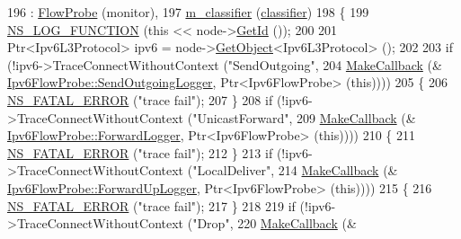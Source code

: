 \begin{DoxyCode}
196   : \hyperlink{classns3_1_1FlowProbe_ae0c5dae57bca03719808497381a24776}{FlowProbe} (monitor),
197     \hyperlink{classns3_1_1Ipv6FlowProbe_a6b4af52e7aef1c6d73e4072afb734da1}{m\_classifier} (\hyperlink{design_8txt_af9e6b398b148789960232a87c72a107e}{classifier})
198 \{
199   \hyperlink{log-macros-disabled_8h_a90b90d5bad1f39cb1b64923ea94c0761}{NS\_LOG\_FUNCTION} (\textcolor{keyword}{this} << node->\hyperlink{classns3_1_1Node_aaf49b64a843565ce3812326313b370ac}{GetId} ());
200 
201   Ptr<Ipv6L3Protocol> ipv6 = node->\hyperlink{classns3_1_1Object_a13e18c00017096c8381eb651d5bd0783}{GetObject}<Ipv6L3Protocol> ();
202 
203   \textcolor{keywordflow}{if} (!ipv6->TraceConnectWithoutContext (\textcolor{stringliteral}{"SendOutgoing"},
204                                          \hyperlink{group__makecallbackmemptr_ga9376283685aa99d204048d6a4b7610a4}{MakeCallback} (&
      \hyperlink{classns3_1_1Ipv6FlowProbe_aed2d199576287ec3c4d411c03b28c837}{Ipv6FlowProbe::SendOutgoingLogger}, Ptr<Ipv6FlowProbe> (\textcolor{keyword}{this}))))
205     \{
206       \hyperlink{group__fatal_ga5131d5e3f75d7d4cbfd706ac456fdc85}{NS\_FATAL\_ERROR} (\textcolor{stringliteral}{"trace fail"});
207     \}
208   \textcolor{keywordflow}{if} (!ipv6->TraceConnectWithoutContext (\textcolor{stringliteral}{"UnicastForward"},
209                                          \hyperlink{group__makecallbackmemptr_ga9376283685aa99d204048d6a4b7610a4}{MakeCallback} (&
      \hyperlink{classns3_1_1Ipv6FlowProbe_a9efca78a831129405b52035b062feec8}{Ipv6FlowProbe::ForwardLogger}, Ptr<Ipv6FlowProbe> (\textcolor{keyword}{this}))))
210     \{
211       \hyperlink{group__fatal_ga5131d5e3f75d7d4cbfd706ac456fdc85}{NS\_FATAL\_ERROR} (\textcolor{stringliteral}{"trace fail"});
212     \}
213   \textcolor{keywordflow}{if} (!ipv6->TraceConnectWithoutContext (\textcolor{stringliteral}{"LocalDeliver"},
214                                          \hyperlink{group__makecallbackmemptr_ga9376283685aa99d204048d6a4b7610a4}{MakeCallback} (&
      \hyperlink{classns3_1_1Ipv6FlowProbe_abed89107dd0b552bb83d8426293d63a5}{Ipv6FlowProbe::ForwardUpLogger}, Ptr<Ipv6FlowProbe> (\textcolor{keyword}{this}))))
215     \{
216       \hyperlink{group__fatal_ga5131d5e3f75d7d4cbfd706ac456fdc85}{NS\_FATAL\_ERROR} (\textcolor{stringliteral}{"trace fail"});
217     \}
218 
219   \textcolor{keywordflow}{if} (!ipv6->TraceConnectWithoutContext (\textcolor{stringliteral}{"Drop"},
220                                          \hyperlink{group__makecallbackmemptr_ga9376283685aa99d204048d6a4b7610a4}{MakeCallback} (&

\end{DoxyCode}
